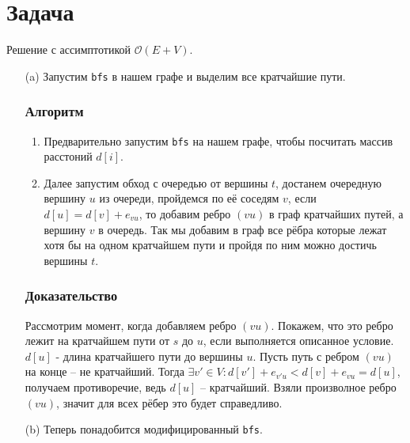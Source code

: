 \documentclass{article}
\newcommand{\complexity}[1]{$\mathcal{O}(#1)$}
\begin{document}
\section*{Задача }
    Решение с ассимптотикой \complexity{E + V}.
    \begin{itemize}
        \item[(a)] 
        Запустим \texttt{bfs} в нашем графе и выделим все кратчайшие пути.
        \subsubsection*{Алгоритм}
        \begin{enumerate}
            \item Предварительно запустим \texttt{bfs} на нашем графе, чтобы посчитать массив расстоний $d[i]$.
            \item Далее запустим обход с очередью от вершины $t$, достанем очередную вершину $u$ из очереди, пройдемся по её соседям $v$, если $d[u] = d[v] + e_{vu}$, то добавим ребро $(vu)$ в граф кратчайших путей, а вершину $v$ в очередь. Так мы добавим в граф все рёбра которые лежат хотя бы на одном кратчайшем пути и пройдя по ним можно достичь вершины $t$.  
        \end{enumerate}
         
        \subsubsection*{Доказательство}
        Рассмотрим момент, когда добавляем ребро $(vu)$. Покажем, что это ребро лежит на кратчайшем пути от $s$ до $u$, если выполняется описанное условие.
        $d[u]$ - длина кратчайшего пути до вершины $u$.
        Пусть путь с ребром $(vu)$ на конце -- не кратчайший. Тогда 	$\exists v' \in V : d[v'] + e_{v'u} < d[v] + e_{vu} = d[u]$, получаем противоречие, ведь $d[u]$ -- кратчайший.
        Взяли произволное ребро $(vu)$, значит для всех рёбер это будет справедливо.
        \item[(b)] Теперь понадобится модифицированный \texttt{bfs}. \newline

\end{itemize}
\end{document}
